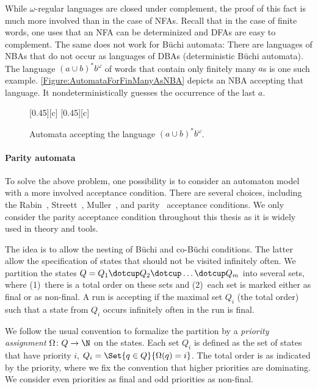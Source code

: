 \documentclass[../../diss.tex]{subfiles}
\begin{document}
While $\omega$-regular languages are closed under complement, the proof of this fact is much more involved than in the case of NFAs.
Recall that in the case of finite words, one uses that an NFA can be determinized and DFAs are easy to complement.
The same does not work for Büchi automata:
There are languages of NBAs that do not occur as languages of DBAs (deterministic Büchi automata).
The language ${(a \cup b)}^* b^\omega$ of words that contain only finitely many $a$s is one such example.
\cref{Figure:AutomataForFinManyAsNBA} depicts an NBA accepting that language.
It nondeterministically guesses the occurrence of the last $a$.

\begin{figure}[t]
    {\centering{}[0.45\textwidth][c]{
        }
    }
    {\centering{}[0.45\textwidth][c]{
        }
    }
    \caption{Automata accepting the language ${(a \cup b)}^* b^\omega$.}%
    \label{Figure:AutomataForFinManyAs}%
\end{figure}

\paragraph{Parity automata}

To solve the above problem, one possibility is to consider an automaton model with a more involved acceptance condition.
There are several choices, including the Rabin~\cite{Rabin68}, Streett~\cite{Streett81}, Muller~\cite{Muller63}, and parity~\cite{Mostowski84} acceptance conditions.
We only consider the parity acceptance condition throughout this thesis as it is widely used in theory and tools.

The idea is to allow the nesting of Büchi and co-Büchi conditions.
The latter allow the specification of states that should not be visited infinitely often.
We partition the states $Q = Q_1 \dotcup Q_2 \dotcup \ldots \dotcup Q_m$ into several sets, where (1)~there is a total order on these sets and (2)~each set is marked either as final or as non-final.
A run is accepting if the maximal set $Q_i$ (\wrt the total order) such that a state from $Q_i$ occurs infinitely often in the run is final.

We follow the usual convention to formalize the partition by a \emph{priority assignment}
\(
    \Omega \colon Q \to \N
\)
on the states.
Each set $Q_i$ is defined as the set of states that have priority $i$, $Q_i = \Set{ q \in Q}{ \Omega(q) = i}$.
The total order is as indicated by the priority, where we fix the convention that higher priorities are dominating.
We consider even priorities as final and odd priorities as non-final.
\end{document}

